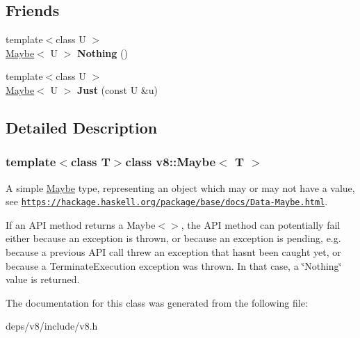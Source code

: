 \subsection*{Friends}
\begin{DoxyCompactItemize}
\item 
\hypertarget{classv8_1_1_maybe_aeb9593e125b42d748acbd69b72c89f37}{}{\footnotesize template$<$class U $>$ }\\\hyperlink{classv8_1_1_maybe}{Maybe}$<$ U $>$ {\bfseries Nothing} ()\label{classv8_1_1_maybe_aeb9593e125b42d748acbd69b72c89f37}

\item 
\hypertarget{classv8_1_1_maybe_aeff0e7fedd63cfebe9a5286e2cd8552d}{}{\footnotesize template$<$class U $>$ }\\\hyperlink{classv8_1_1_maybe}{Maybe}$<$ U $>$ {\bfseries Just} (const U \&u)\label{classv8_1_1_maybe_aeff0e7fedd63cfebe9a5286e2cd8552d}

\end{DoxyCompactItemize}


\subsection{Detailed Description}
\subsubsection*{template$<$class T$>$class v8\+::\+Maybe$<$ T $>$}

A simple \hyperlink{classv8_1_1_maybe}{Maybe} type, representing an object which may or may not have a value, see \href{https://hackage.haskell.org/package/base/docs/Data-Maybe.html}{\tt https\+://hackage.\+haskell.\+org/package/base/docs/\+Data-\/\+Maybe.\+html}.

If an A\+P\+I method returns a Maybe$<$$>$, the A\+P\+I method can potentially fail either because an exception is thrown, or because an exception is pending, e.\+g. because a previous A\+P\+I call threw an exception that hasn\textquotesingle{}t been caught yet, or because a Terminate\+Execution exception was thrown. In that case, a \char`\"{}\+Nothing\char`\"{} value is returned. 

The documentation for this class was generated from the following file\+:\begin{DoxyCompactItemize}
\item 
deps/v8/include/v8.\+h\end{DoxyCompactItemize}
